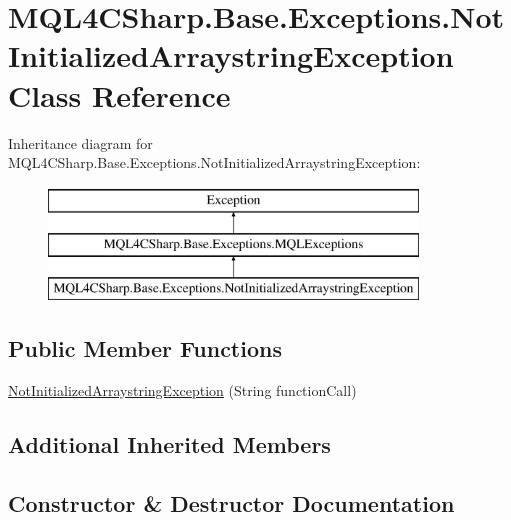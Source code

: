 \hypertarget{class_m_q_l4_c_sharp_1_1_base_1_1_exceptions_1_1_not_initialized_arraystring_exception}{}\section{M\+Q\+L4\+C\+Sharp.\+Base.\+Exceptions.\+Not\+Initialized\+Arraystring\+Exception Class Reference}
\label{class_m_q_l4_c_sharp_1_1_base_1_1_exceptions_1_1_not_initialized_arraystring_exception}
Inheritance diagram for M\+Q\+L4\+C\+Sharp.\+Base.\+Exceptions.\+Not\+Initialized\+Arraystring\+Exception\+:\begin{figure}[H]
\begin{center}
\leavevmode
\includegraphics[height=3.000000cm]{class_m_q_l4_c_sharp_1_1_base_1_1_exceptions_1_1_not_initialized_arraystring_exception}
\end{center}
\end{figure}
\subsection*{Public Member Functions}
\begin{DoxyCompactItemize}
\item 
\hyperlink{class_m_q_l4_c_sharp_1_1_base_1_1_exceptions_1_1_not_initialized_arraystring_exception_a0cb9c67941fac3a1418c8a4e017dd00b}{Not\+Initialized\+Arraystring\+Exception} (String function\+Call)
\end{DoxyCompactItemize}
\subsection*{Additional Inherited Members}


\subsection{Constructor \& Destructor Documentation}
